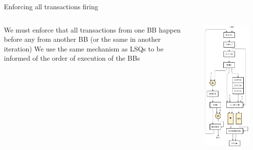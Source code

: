 \documentclass{beamer}
\begin{document}
\begin{frame}{Enforcing all transactions firing}
\begin{columns}
    \begin{column}{0.45\textwidth}
    We must enforce that all transactions from one BB happen before any from another BB (or the same in another iteration) \newline \newline
    We use the same mechanism as LSQs to be informed of the order of execution of the BBs
    \end{column}
    \begin{column}{0.1\textwidth}
    \end{column}
    \begin{column}{0.45\textwidth}
      \includegraphics[scale=0.25]{blocking_shared_solution.png}
    \end{column}
  \end{columns}
\end{frame}
\end{document}
